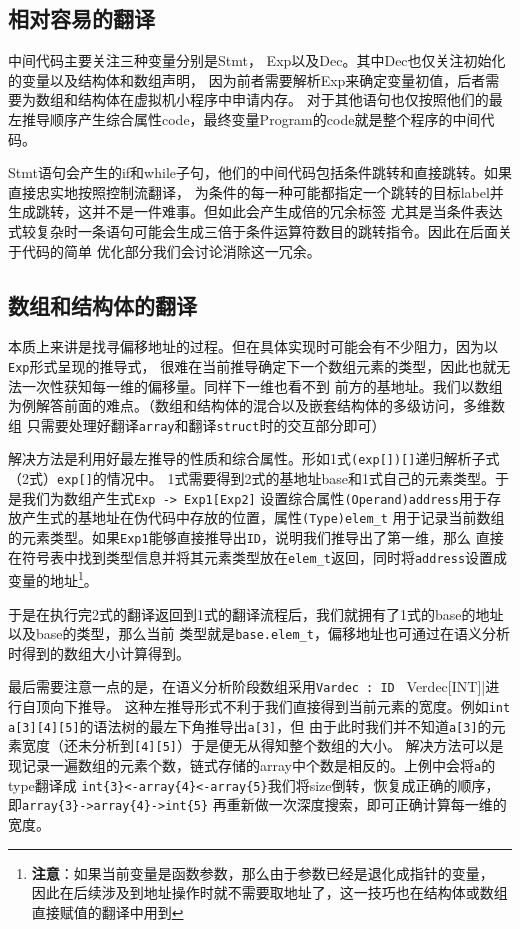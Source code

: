 \documentclass[twocolumn]{article}
\begin{document}
\subsection{相对容易的翻译}

中间代码主要关注三种变量分别是Stmt， Exp以及Dec。其中Dec也仅关注初始化的变量以及结构体和数组声明，
因为前者需要解析Exp来确定变量初值，后者需要为数组和结构体在虚拟机小程序中申请内存。
对于其他语句也仅按照他们的最左推导顺序产生综合属性code，最终变量Program的code就是整个程序的中间代码。

Stmt语句会产生的if和while子句，他们的中间代码包括条件跳转和直接跳转。如果直接忠实地按照控制流翻译，
为条件的每一种可能都指定一个跳转的目标label并生成跳转，这并不是一件难事。但如此会产生成倍的冗余标签
尤其是当条件表达式较复杂时一条语句可能会生成三倍于条件运算符数目的跳转指令。因此在后面关于代码的简单
优化部分我们会讨论消除这一冗余。

\subsection{数组和结构体的翻译}
本质上来讲是找寻偏移地址的过程。但在具体实现时可能会有不少阻力，因为以\verb|Exp|形式呈现的推导式，
很难在当前推导确定下一个数组元素的类型，因此也就无法一次性获知每一维的偏移量。同样下一维也看不到
前方的基地址。我们以数组为例解答前面的难点。（数组和结构体的混合以及嵌套结构体的多级访问，多维数组
只需要处理好翻译\verb|array|和翻译\verb|struct|时的交互部分即可）

解决方法是利用好最左推导的性质和综合属性。形如1式\verb|(exp[])[]|递归解析子式（2式）\verb|exp[]|的情况中。
1式需要得到2式的基地址base和1式自己的元素类型。于是我们为数组产生式\verb|Exp -> Exp1[Exp2]|
设置综合属性\verb|(Operand)address|用于存放产生式的基地址在伪代码中存放的位置，属性\verb|(Type)elem_t|
用于记录当前数组的元素类型。如果\verb|Exp1|能够直接推导出\verb|ID|，说明我们推导出了第一维，那么
直接在符号表中找到类型信息并将其元素类型放在\verb|elem_t|返回，同时将\verb|address|设置成
变量的地址\footnote{\textbf{注意}：如果当前变量是函数参数，那么由于参数已经是退化成指针的变量，
    因此在后续涉及到地址操作时就不需要取地址了，这一技巧也在结构体或数组直接赋值的翻译中用到}。

于是在执行完2式的翻译返回到1式的翻译流程后，我们就拥有了1式的base的地址以及base的类型，那么当前
类型就是\verb|base.elem_t|，偏移地址也可通过在语义分析时得到的数组大小计算得到。

最后需要注意一点的是，在语义分析阶段数组采用\verb|Vardec : ID | Verdec[INT]|进行自顶向下推导。
这种左推导形式不利于我们直接得到当前元素的宽度。例如\verb|int a[3][4][5]|的语法树的最左下角推导出\verb|a[3]|，但
由于此时我们并不知道\verb|a[3]|的元素宽度（还未分析到\verb|[4][5]|）于是便无从得知整个数组的大小。
解决方法可以是现记录一遍数组的元素个数，链式存储的array中个数是相反的。上例中会将\verb|a|的type翻译成
\verb|int{3}<-array{4}<-array{5}|我们将size倒转，恢复成正确的顺序，即\verb|array{3}->array{4}->int{5}|
再重新做一次深度搜索，即可正确计算每一维的宽度。
\end{document}
